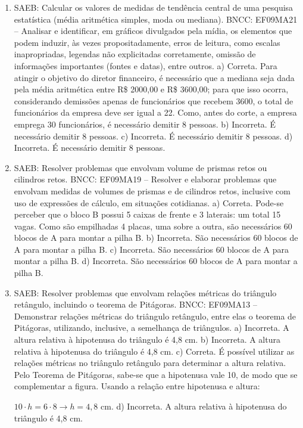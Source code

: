\begin{enumerate}
\item
SAEB: Calcular os valores de medidas de tendência central de uma
pesquisa estatística (média aritmética simples, moda ou mediana).
BNCC: EF09MA21 -- Analisar e identificar, em gráficos divulgados pela mídia, os
elementos que podem induzir, às vezes propositadamente, erros de
leitura, como escalas inapropriadas, legendas não explicitadas
corretamente, omissão de informações importantes (fontes e datas), entre
outros.
a) Correta. Para atingir o objetivo do diretor financeiro, é necessário
que a mediana seja dada pela média aritmética entre R\$ 2000,00 e R\$ 
3600,00; para que isso ocorra, considerando demissões apenas de 
funcionários  que recebem 3600, o total de funcionários da empresa deve
ser igual a 22. Como, antes do corte, a empresa emprega 30 funcionários,
é necessário demitir 8 pessoas.
b) Incorreta. É necessário demitir 8 pessoas.
c) Incorreta. É necessário demitir 8 pessoas.
d) Incorreta. É necessário demitir 8 pessoas.

\item
SAEB: Resolver problemas que envolvam volume de prismas retos ou
cilindros retos.
BNCC: EF09MA19 -- Resolver e elaborar problemas que envolvam medidas de
volumes de prismas e de cilindros retos, inclusive com uso de expressões
de cálculo, em situações cotidianas.
a) Correta. Pode-se perceber que o bloco B possui 5 caixas de frente e 3
laterais: um total 15 vagas. Como são empilhadas 4 placas, uma sobre a
outra, são necessários 60 blocos de A para montar a pilha B.
b) Incorreta. São necessários 60 blocos de A para montar a pilha B.
c) Incorreta. São necessários 60 blocos de A para montar a pilha B.
d) Incorreta. São necessários 60 blocos de A para montar a pilha B.

\item
SAEB: Resolver problemas que envolvam relações métricas do
triângulo retângulo, incluindo o teorema de Pitágoras.
BNCC: EF09MA13 -- Demonstrar relações métricas do triângulo retângulo,
entre elas o teorema de Pitágoras, utilizando, inclusive, a semelhança
de triângulos.
a) Incorreta. A altura relativa à hipotenusa do triângulo é 4,8 cm.
b) Incorreta. A altura relativa à hipotenusa do triângulo é 4,8 cm.
c) Correta. É possível utilizar as relações métricas no triângulo
retângulo para determinar a altura relativa.
Pelo Teorema de Pitágoras, sabe-se que a hipotenusa vale 10, de modo que
se complementar a figura.
Usando a relação entre hipotenusa e altura: 

$10 \cdot h = 6 \cdot 8 \rightarrow h = 4,8$ cm.
d) Incorreta. A altura relativa à hipotenusa do triângulo é 4,8 cm.


\end{enumerate}
